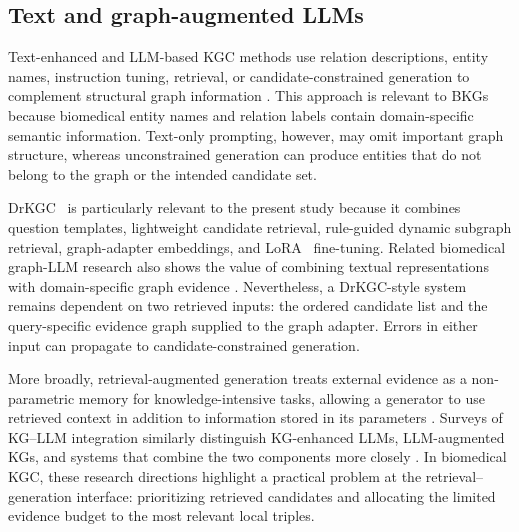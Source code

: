 \documentclass[pdflatex,sn-mathphys-num]{sn-jnl}
\newcommand{\drkgc}{DrKGC}
\begin{document}
\subsection{Text and graph-augmented LLMs}

Text-enhanced and LLM-based KGC methods use relation descriptions, entity names, instruction tuning, retrieval, or candidate-constrained generation to complement structural graph information \citep{devlin2019bert,gu2021domain,luo2022biogpt,wang2022simkgc,wei2026kicgptv2,zhang2024making,liu2024finetuning,wang2024kc}. This approach is relevant to BKGs because biomedical entity names and relation labels contain domain-specific semantic information. Text-only prompting, however, may omit important graph structure, whereas unconstrained generation can produce entities that do not belong to the graph or the intended candidate set.

\drkgc{}~\citep{xiao2025drkgc} is particularly relevant to the present study because it combines question templates, lightweight candidate retrieval, rule-guided dynamic subgraph retrieval, graph-adapter embeddings, and LoRA~\citep{hulora} fine-tuning. Related biomedical graph-LLM research also shows the value of combining textual representations with domain-specific graph evidence \citep{xiao2024fuselinker}. Nevertheless, a \drkgc{}-style system remains dependent on two retrieved inputs: the ordered candidate list and the query-specific evidence graph supplied to the graph adapter. Errors in either input can propagate to candidate-constrained generation.

More broadly, retrieval-augmented generation treats external evidence as a non-parametric memory for knowledge-intensive tasks, allowing a generator to use retrieved context in addition to information stored in its parameters \citep{lewis2020retrieval}. Surveys of KG--LLM integration similarly distinguish KG-enhanced LLMs, LLM-augmented KGs, and systems that combine the two components more closely \citep{pan2024unifying}. In biomedical KGC, these research directions highlight a practical problem at the retrieval--generation interface: prioritizing retrieved candidates and allocating the limited evidence budget to the most relevant local triples.
\end{document}
